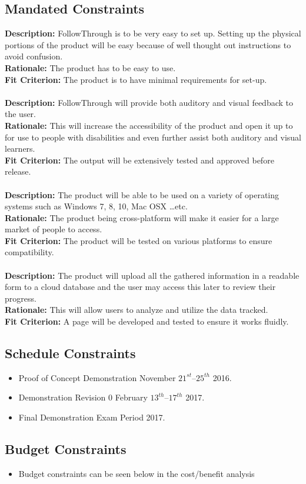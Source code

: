 \subsection{Mandated Constraints}
\textbf{Description:} FollowThrough is to be very easy to set up. Setting up the physical portions of the product will be easy because of well thought out instructions to avoid confusion.\\
\textbf{Rationale:} The product has to be easy to use.\\
\textbf{Fit Criterion:} The product is to have minimal requirements for set-up.\\\\
\textbf{Description:} FollowThrough will provide both auditory and visual feedback to the user.\\
\textbf{Rationale:} This will increase the accessibility of the product and open it up to for use to people with disabilities and even further assist both auditory and visual learners.\\
\textbf{Fit Criterion:} The output will be extensively tested and approved before release.\\\\
\textbf{Description:} The product will be able to be used on a variety of operating systems such as Windows 7, 8, 10, Mac OSX …etc.\\
\textbf{Rationale:} The product being cross-platform will make it easier for a large market of people to access.\\
\textbf{Fit Criterion:} The product will be tested on various platforms to ensure compatibility.\\\\
\textbf{Description:} The product will upload all the gathered information in a readable form to a cloud database and the user may access this later to review their progress.\\
\textbf{Rationale:} This will allow users to analyze and utilize the data tracked.\\
\textbf{Fit Criterion:} A page will be developed and tested to ensure it works fluidly.
\subsection{Schedule Constraints}
\begin{itemize}
    \item Proof of Concept Demonstration November $21^{st} – 25^{th}$ 2016.
    \item Demonstration Revision 0 February $13^{th} – 17^{th}$ 2017.
    \item Final Demonstration Exam Period 2017.
\end{itemize}

\subsection{Budget Constraints}
\begin{itemize}
    \item Budget constraints can be seen below in the cost/benefit analysis
\end{itemize}

